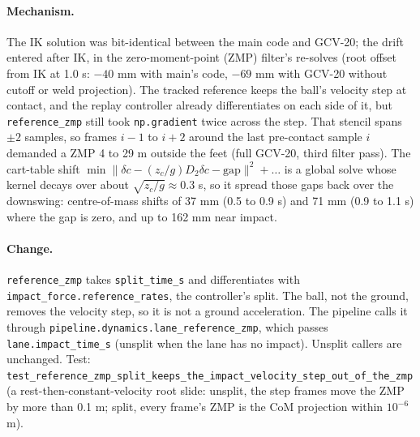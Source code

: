 \documentclass[11pt,a4paper]{article}
\begin{document}
\paragraph{Mechanism.} The IK solution was bit-identical between the main
code and GCV-20; the drift entered after IK, in the zero-moment-point (ZMP)
filter's re-solves (root offset from IK at 1.0 s: $-40$ mm with main's code,
$-69$ mm with GCV-20 without cutoff or weld projection). The tracked
reference keeps the ball's velocity step at contact, and the replay
controller already differentiates on each side of it, but
\texttt{reference\_zmp} still took \texttt{np.gradient} twice across the
step. That stencil spans $\pm 2$ samples, so frames $i-1$ to $i+2$ around the
last pre-contact sample $i$ demanded a ZMP 4 to 29 m outside the feet (full
GCV-20, third filter pass). The cart-table shift
$\min\lVert \delta c-(z_c/g)D_2\delta c-\mathrm{gap}\rVert^2+\ldots$ is a
global solve whose kernel decays over about $\sqrt{z_c/g}\approx0.3$ s, so it
spread those gaps back over the downswing: centre-of-mass shifts of 37 mm
(0.5 to 0.9 s) and 71 mm (0.9 to 1.1 s) where the gap is zero, and up to
162 mm near impact.

\paragraph{Change.} \texttt{reference\_zmp} takes \texttt{split\_time\_s} and
differentiates with \texttt{impact\_force.reference\_rates}, the controller's
split. The ball, not the ground, removes the velocity step, so it is not a
ground acceleration. The pipeline calls it through
\texttt{pipeline.dynamics.lane\_reference\_zmp}, which passes
\texttt{lane.impact\_time\_s} (unsplit when the lane has no impact). Unsplit
callers are unchanged. Test:
\texttt{test\_reference\_zmp\_split\_keeps\_the\_impact\_velocity\_step\_out\_of\_the\_zmp}
(a rest-then-constant-velocity root slide: unsplit, the step frames move the
ZMP by more than 0.1 m; split, every frame's ZMP is the CoM projection within
$10^{-6}$ m).
\end{document}
